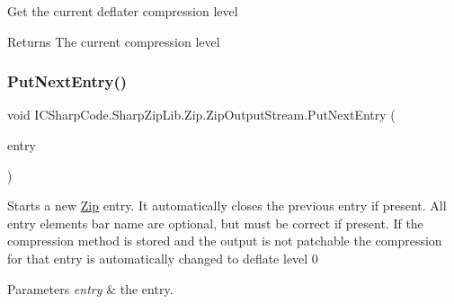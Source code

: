 Get the current deflater compression level 

\begin{DoxyReturn}{Returns}
The current compression level
\end{DoxyReturn}
\mbox{\label{class_i_c_sharp_code_1_1_sharp_zip_lib_1_1_zip_1_1_zip_output_stream_a1eb2730350237fd6e7e41a06e3ede119}} 
\subsubsection{\texorpdfstring{Put\+Next\+Entry()}{PutNextEntry()}}
{\footnotesize\ttfamily void I\+C\+Sharp\+Code.\+Sharp\+Zip\+Lib.\+Zip.\+Zip\+Output\+Stream.\+Put\+Next\+Entry (\begin{DoxyParamCaption}\item[{\hyperlink{class_i_c_sharp_code_1_1_sharp_zip_lib_1_1_zip_1_1_zip_entry}{Zip\+Entry}}]{entry }\end{DoxyParamCaption})\hspace{0.3cm}{\ttfamily [inline]}}



Starts a new \hyperlink{namespace_i_c_sharp_code_1_1_sharp_zip_lib_1_1_zip}{Zip} entry. It automatically closes the previous entry if present. All entry elements bar name are optional, but must be correct if present. If the compression method is stored and the output is not patchable the compression for that entry is automatically changed to deflate level 0 


\begin{DoxyParams}{Parameters}
{\em entry} & the entry. \\
\hline
\end{DoxyParams}

